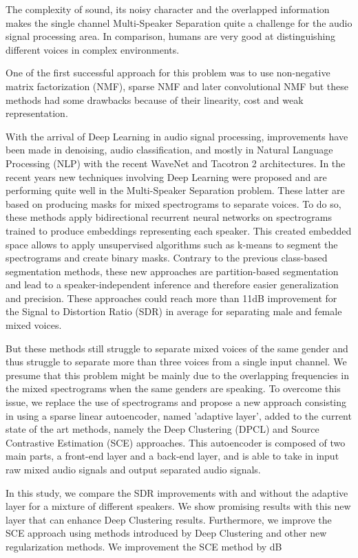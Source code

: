 \documentclass[master, tikz, final,11pt, dvipdfmx]{iscs-thesis}
\date{July 11, 2018}
\begin{document}
\begin{eabstract}

The complexity of sound, its noisy character and the overlapped information makes the single channel Multi-Speaker Separation quite a challenge for the audio signal processing area. In comparison, humans are very good at distinguishing different voices in complex environments.

One of the first successful approach for this problem was to use non-negative matrix factorization (NMF), sparse NMF and later convolutional NMF but these methods had some drawbacks because of their linearity, cost and weak representation.

With the arrival of Deep Learning in audio signal processing, improvements have been made in denoising, audio classification, and mostly in Natural Language Processing  (NLP) with the recent WaveNet and Tacotron 2 architectures. In the recent years new techniques involving Deep Learning were proposed and are performing quite well in the Multi-Speaker Separation problem. These latter are based on producing masks for mixed spectrograms to separate voices. To do so, these methods apply bidirectional recurrent neural networks on spectrograms trained to produce embeddings representing each speaker. This created embedded space allows to apply unsupervised algorithms such as k-means to segment the spectrograms and create binary masks. Contrary to the previous class-based segmentation methods, these new approaches are partition-based segmentation and lead to a speaker-independent inference and therefore easier generalization and precision. These approaches could reach more than 11dB improvement for the Signal to Distortion Ratio (SDR) in average for separating male and female mixed voices.

But these methods still struggle to separate mixed voices of the same gender and thus struggle to separate more than three voices from a single input channel. We presume that this problem might be mainly due to the overlapping frequencies in the mixed spectrograms when the same genders are speaking. To overcome this issue, we replace the use of spectrograms and propose a new approach consisting in using a sparse linear autoencoder, named 'adaptive layer', added to the current state of the art methods, namely the Deep Clustering (DPCL) and Source Contrastive Estimation (SCE) approaches. This autoencoder is composed of two main parts, a front-end layer and a back-end layer, and is able to take in input raw mixed audio signals and output separated audio signals. 

In this study, we compare the SDR improvements with and without the adaptive layer for a mixture of different speakers. We show promising results with this new layer that can enhance Deep Clustering results.
Furthermore, we improve the SCE approach using methods introduced by Deep Clustering and other new regularization methods. We improvement the SCE method by dB
\end{eabstract}
\end{document}

